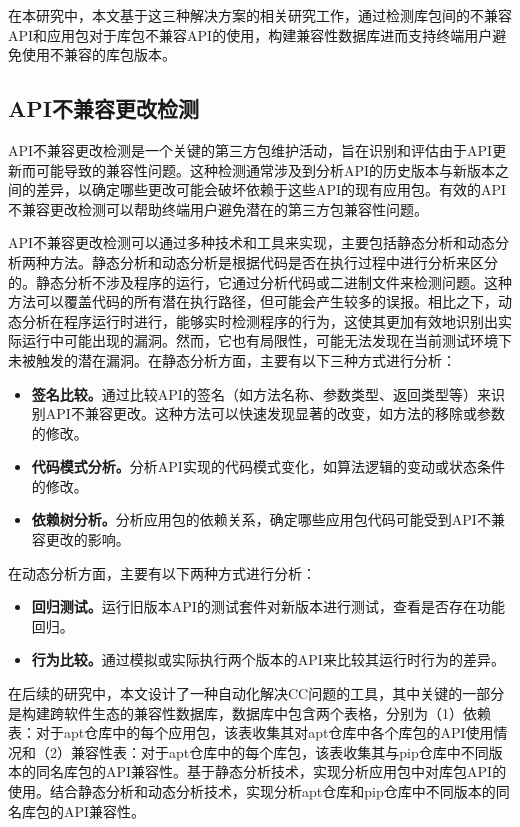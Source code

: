 在本研究中，本文基于这三种解决方案的相关研究工作，通过检测库包间的不兼容API和应用包对于库包不兼容API的使用，构建兼容性数据库进而支持终端用户避免使用不兼容的库包版本。

\subsection{API不兼容更改检测}
API不兼容更改检测是一个关键的第三方包维护活动，旨在识别和评估由于API更新而可能导致的兼容性问题。这种检测通常涉及到分析API的历史版本与新版本之间的差异，以确定哪些更改可能会破坏依赖于这些API的现有应用包。有效的API不兼容更改检测可以帮助终端用户避免潜在的第三方包兼容性问题。

API不兼容更改检测可以通过多种技术和工具来实现，主要包括静态分析和动态分析两种方法。静态分析和动态分析是根据代码是否在执行过程中进行分析来区分的。静态分析不涉及程序的运行，它通过分析代码或二进制文件来检测问题。这种方法可以覆盖代码的所有潜在执行路径，但可能会产生较多的误报。相比之下，动态分析在程序运行时进行，能够实时检测程序的行为，这使其更加有效地识别出实际运行中可能出现的漏洞。然而，它也有局限性，可能无法发现在当前测试环境下未被触发的潜在漏洞。在静态分析方面，主要有以下三种方式进行分析：
\begin{itemize}
	\item \textbf{签名比较。}通过比较API的签名（如方法名称、参数类型、返回类型等）来识别API不兼容更改。这种方法可以快速发现显著的改变，如方法的移除或参数的修改。
	\item \textbf{代码模式分析。}分析API实现的代码模式变化，如算法逻辑的变动或状态条件的修改。
	\item \textbf{依赖树分析。}分析应用包的依赖关系，确定哪些应用包代码可能受到API不兼容更改的影响。
\end{itemize}
在动态分析方面，主要有以下两种方式进行分析：
\begin{itemize}
	\item \textbf{回归测试。}运行旧版本API的测试套件对新版本进行测试，查看是否存在功能回归。
	\item \textbf{行为比较。}通过模拟或实际执行两个版本的API来比较其运行时行为的差异。
\end{itemize}

在后续的研究中，本文设计了一种自动化解决CC问题的工具\tool{}，其中关键的一部分是构建跨软件生态的兼容性数据库，数据库中包含两个表格，分别为（1）依赖表：对于apt仓库中的每个应用包，该表收集其对apt仓库中各个库包的API使用情况和（2）兼容性表：对于apt仓库中的每个库包，该表收集其与pip仓库中不同版本的同名库包的API兼容性。\tool{}基于静态分析技术，实现分析应用包中对库包API的使用。\tool{}结合静态分析和动态分析技术，实现分析apt仓库和pip仓库中不同版本的同名库包的API兼容性。

